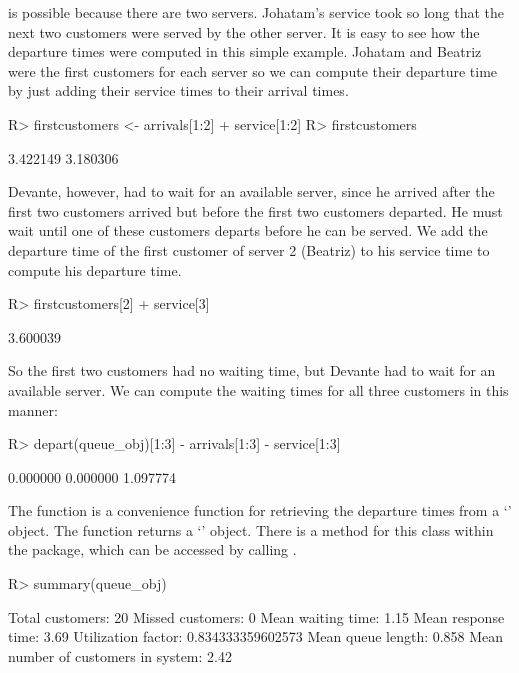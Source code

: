 \documentclass[article]{jss}
\begin{document}
is possible because there are two servers. Johatam's service took so
long that the next two customers were served by the other server. It
is easy to see how the departure times were computed in this simple
example. Johatam and Beatriz were the first customers for each server
so we can compute their departure time by just adding their service
times to their arrival times.
%
\begin{CodeChunk}
\begin{Sinput}
R> firstcustomers <- arrivals[1:2] + service[1:2]
R> firstcustomers
\end{Sinput}
\begin{Soutput}
[1] 3.422149 3.180306
\end{Soutput}
\end{CodeChunk}
%
Devante, however, had to wait for an available server, since he arrived after the first two customers arrived but before the first two customers departed. He must wait until one of these customers departs before he can be served. We add the departure time of the first customer of server 2 (Beatriz) to his service time to compute his departure time.
%
\begin{CodeChunk}
\begin{Sinput}
R> firstcustomers[2] + service[3]
\end{Sinput}
\begin{Soutput}
[1] 3.600039
\end{Soutput}
\end{CodeChunk}
%
So the first two customers had no waiting time, but Devante had to wait for an available server. We can compute the waiting times for all three customers in this manner:
%
\begin{CodeChunk}
\begin{Sinput}
R> depart(queue_obj)[1:3] - arrivals[1:3] - service[1:3]
\end{Sinput}
\begin{Soutput}
[1] 0.000000 0.000000 1.097774
\end{Soutput}
\end{CodeChunk}
%
The  function is a convenience function for retrieving
the departure times from a `' object. The
 function returns a `'
object. There is a  method for this class within the
 package, which can be accessed by calling
.
%
\begin{CodeChunk}
\begin{Sinput}
R> summary(queue_obj)
\end{Sinput}
\begin{Soutput}
Total customers:
 20
Missed customers:
 0
Mean waiting time:
 1.15
Mean response time:
 3.69
Utilization factor:
 0.834333359602573
Mean queue length:
 0.858
Mean number of customers in system:
 2.42
\end{Soutput}
\end{CodeChunk}
\end{document}
